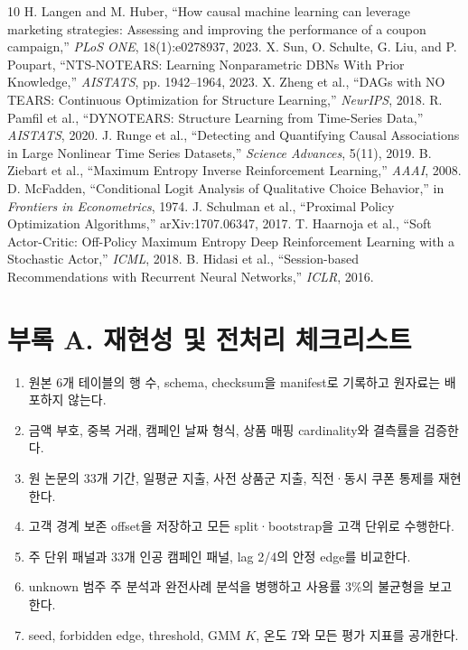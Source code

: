 \documentclass[11pt,twocolumn]{article}
\begin{document}
\balance
\begingroup
\footnotesize
\setlength{\parindent}{0pt}
\begin{thebibliography}{10}
 H. Langen and M. Huber, ``How causal machine learning can leverage marketing strategies: Assessing and improving the performance of a coupon campaign,'' \textit{PLoS ONE}, 18(1):e0278937, 2023.
 X. Sun, O. Schulte, G. Liu, and P. Poupart, ``NTS-NOTEARS: Learning Nonparametric DBNs With Prior Knowledge,'' \textit{AISTATS}, pp. 1942--1964, 2023.
 X. Zheng et al., ``DAGs with NO TEARS: Continuous Optimization for Structure Learning,'' \textit{NeurIPS}, 2018.
 R. Pamfil et al., ``DYNOTEARS: Structure Learning from Time-Series Data,'' \textit{AISTATS}, 2020.
 J. Runge et al., ``Detecting and Quantifying Causal Associations in Large Nonlinear Time Series Datasets,'' \textit{Science Advances}, 5(11), 2019.
 B. Ziebart et al., ``Maximum Entropy Inverse Reinforcement Learning,'' \textit{AAAI}, 2008.
 D. McFadden, ``Conditional Logit Analysis of Qualitative Choice Behavior,'' in \textit{Frontiers in Econometrics}, 1974.
 J. Schulman et al., ``Proximal Policy Optimization Algorithms,'' arXiv:1707.06347, 2017.
 T. Haarnoja et al., ``Soft Actor-Critic: Off-Policy Maximum Entropy Deep Reinforcement Learning with a Stochastic Actor,'' \textit{ICML}, 2018.
 B. Hidasi et al., ``Session-based Recommendations with Recurrent Neural Networks,'' \textit{ICLR}, 2016.
\end{thebibliography}

\section*{부록 A. 재현성 및 전처리 체크리스트}
\begin{enumerate}
\item 원본 6개 테이블의 행 수, schema, checksum을 manifest로 기록하고 원자료는 배포하지 않는다.
\item 금액 부호, 중복 거래, 캠페인 날짜 형식, 상품 매핑 cardinality와 결측률을 검증한다.
\item 원 논문의 33개 기간, 일평균 지출, 사전 상품군 지출, 직전·동시 쿠폰 통제를 재현한다.
\item 고객 경계 보존 offset을 저장하고 모든 split·bootstrap을 고객 단위로 수행한다.
\item 주 단위 패널과 33개 인공 캠페인 패널, lag 2/4의 안정 edge를 비교한다.
\item unknown 범주 주 분석과 완전사례 분석을 병행하고 사용률 3\%의 불균형을 보고한다.
\item seed, forbidden edge, threshold, GMM $K$, 온도 $T$와 모든 평가 지표를 공개한다.
\end{enumerate}
\endgroup
\end{document}
